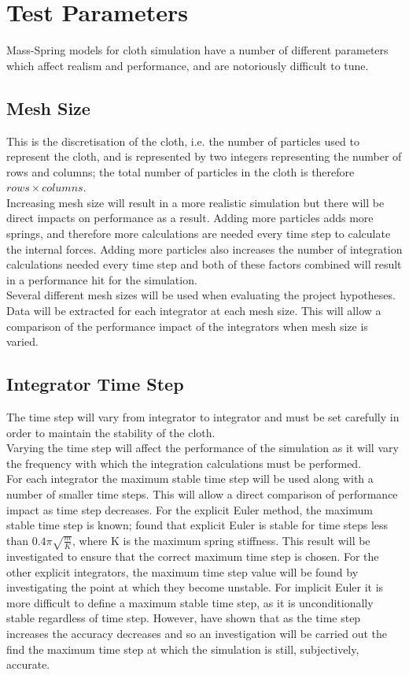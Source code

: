 \section{Test Parameters}
Mass-Spring models for cloth simulation have a number of different parameters which affect realism and performance, and are notoriously difficult to tune.

\subsection{Mesh Size}
This is the discretisation of the cloth, i.e. the number of particles used to represent the cloth, and is represented by two integers representing the number of rows and columns; the total number of particles in the cloth is therefore $rows \times columns$.
\\Increasing mesh size will result in a more realistic simulation but there will be direct impacts on performance as a result. Adding more particles adds more springs, and therefore more calculations are needed every time step to calculate the internal forces. Adding more particles also increases the number of integration calculations needed every time step and both of these factors combined will result in a performance hit for the simulation.
\\Several different mesh sizes will be used when evaluating the project hypotheses. Data will be extracted for each integrator at each mesh size. This will allow a comparison of the performance impact of the integrators when mesh size is varied.

\subsection{Integrator Time Step}
The time step will vary from integrator to integrator and must be set carefully in order to maintain the stability of the cloth.
\\Varying the time step will affect the performance of the simulation as it will vary the frequency with which the integration calculations must be performed.
\\For each integrator the maximum stable time step will be used along with a number of smaller time steps. This will allow a direct comparison of performance impact as time step decreases. For the explicit Euler method, the maximum stable time step is known; \textcite[2]{Vassilev2001} found that explicit Euler is stable for time steps less than $0.4\pi\sqrt{\frac{m}{K}}$, where K is the maximum spring stiffness. This result will be investigated to ensure that the correct maximum time step is chosen. For the other explicit integrators, the maximum time step value will be found by investigating the point at which they become unstable. For implicit Euler it is more difficult to define a maximum stable time step, as it is unconditionally stable regardless of time step. However, \textcite{Volino2001} have shown that as the time step increases the accuracy decreases and so an investigation will be carried out the find the maximum time step at which the simulation is still, subjectively, accurate.

